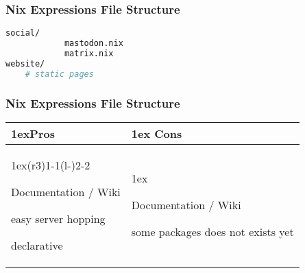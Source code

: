 \documentclass{beamer}
\begin{document}
\begin{frame}[fragile]
\frametitle{Nix Expressions File Structure}

\begin{lstlisting}[language=bash]
		social/
			mastodon.nix
			matrix.nix
website/
	# static pages

\end{lstlisting}

\end{frame}


\begin{frame}[fragile]
\frametitle{Nix Expressions File Structure}
\begin{table}
\begin{tabularx}{\linewidth}{>{\parskip1ex}X@{\kern4\tabcolsep}>{\parskip1ex}X}
\toprule
\hfil\bfseries Pros
&
\hfil\bfseries Cons
\\\cmidrule(r{3\tabcolsep}){1-1}\cmidrule(l{-\tabcolsep}){2-2}

Documentation / Wiki\par
easy server hopping\par
declarative \par
&

Documentation / Wiki\par
some packages does not exists yet

\\\bottomrule
\end{tabularx}
\end{table}
\end{frame}
\end{document}
